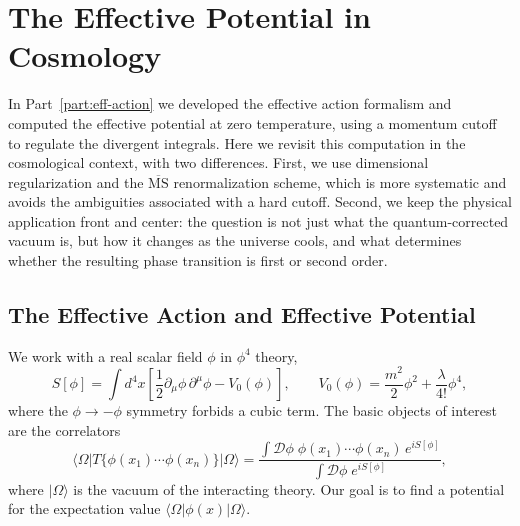 \chapter{The Effective Potential in Cosmology}
\label{ch:eff-pot-cosmo}

In Part~\ref{part:eff-action} we developed the effective action
formalism and computed the effective potential at zero temperature,
using a momentum cutoff to regulate the divergent integrals. Here we
revisit this computation in the cosmological context, with two
differences. First, we use dimensional regularization and the
$\overline{\text{MS}}$ renormalization scheme, which is more systematic
and avoids the ambiguities associated with a hard cutoff. Second, we
keep the physical application front and center: the question is not just
what the quantum-corrected vacuum is, but how it changes as the universe
cools, and what determines whether the resulting phase transition is
first or second order.

\section{The Effective Action and Effective Potential}

We work with a real scalar field $\phi$ in $\phi^4$ theory,
\begin{equation}
	S[\phi] = \int d^4x\left[
		\frac{1}{2}\partial_\mu\phi\,\partial^\mu\phi
		- V_0(\phi)\right],\qquad
	V_0(\phi) = \frac{m^2}{2}\phi^2 + \frac{\lambda}{4!}\phi^4,
\end{equation}
where the $\phi\to-\phi$ symmetry forbids a cubic term. The basic
objects of interest are the correlators
\begin{equation}
	\langle\Omega|T\{\phi(x_1)\cdots\phi(x_n)\}|\Omega\rangle
	= \frac{\int\mathcal{D}\phi\;\phi(x_1)\cdots\phi(x_n)\,
		e^{iS[\phi]}}{\int\mathcal{D}\phi\;e^{iS[\phi]}},
\end{equation}
where $|\Omega\rangle$ is the vacuum of the interacting theory. Our goal
is to find a potential for the expectation value
$\langle\Omega|\phi(x)|\Omega\rangle$.

